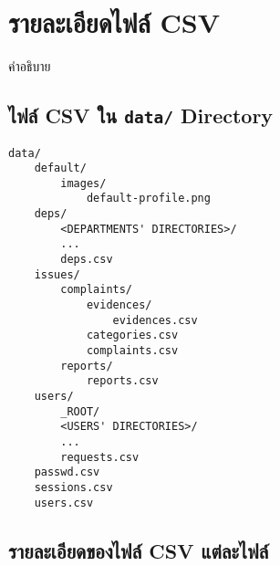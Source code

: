 \documentclass[../docs.tex]{subfiles}
\begin{document}
\section{รายละเอียดไฟล์ CSV}

คำอธิบาย

\subsection{ไฟล์ CSV ใน \texttt{data\slash} Directory}

\begin{lstlisting}
data/
    default/
        images/
            default-profile.png
    deps/
        <DEPARTMENTS' DIRECTORIES>/
        ...
        deps.csv
    issues/
        complaints/
            evidences/
                evidences.csv
            categories.csv
            complaints.csv
        reports/
            reports.csv
    users/
        _ROOT/
        <USERS' DIRECTORIES>/
        ...
        requests.csv
    passwd.csv
    sessions.csv
    users.csv
\end{lstlisting}

\subsection{รายละเอียดของไฟล์ CSV แต่ละไฟล์}
\noindent\blindtext[3]
\end{document}
